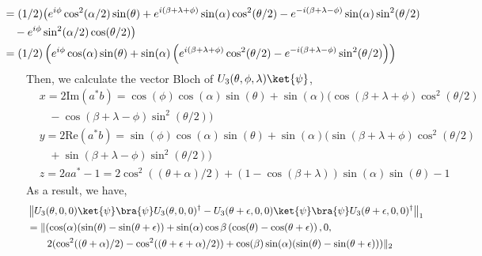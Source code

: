 \begin{example} 
\begin{align*}
  \hspace{-25pt} & = (1/2) \big( e^{i \phi} \cos^2(\alpha/2) \sin(\theta) + e^{i (\beta + \lambda + \phi)} \sin(\alpha) \cos^2(\theta/2) - e^{-i (\beta + \lambda -\phi)} \sin(\alpha) \sin^2(\theta/2) \\
  \hspace{-25pt} & \hspace{10pt}  - e^{i \phi} \sin^2(\alpha/2) \cos(\theta/2)  \big) \\
  \hspace{-25pt} & = (1/2) \left( e^{i \phi}\cos(\alpha) \sin(\theta) +  \sin(\alpha) \left(e^{i (\beta + \lambda + \phi)} \cos^2(\theta/2) - e^{-i (\beta + \lambda - \phi)} \sin^2(\theta/2)\right)  \right)
\end{align*}
Then, we calculate the vector Bloch of $U_3(\theta, \phi, \lambda) \ket{\psi}$,
\begin{align*}
  &x = 2 \text{Im} \left( a^{*}b \right) =   \cos(\phi) \cos(\alpha) \sin(\theta) +  \sin(\alpha) \big(\cos{(\beta + \lambda + \phi)} \cos^2(\theta/2) \\
  & \hspace{10pt} - \cos{(\beta + \lambda - \phi)} \sin^2(\theta/2)\big)  \\
  &y = 2 \text{Re} \left( a^{*}b \right) = \sin(\phi) \cos(\alpha) \sin(\theta) +  \sin(\alpha) \big(\sin{(\beta + \lambda + \phi)} \cos^2(\theta/2) \\
  & \hspace{10pt} + \sin{(\beta + \lambda - \phi)} \sin^2(\theta/2)\big) \\
  & z = 2 aa^* -1 = 2 \cos^2((\theta+\alpha)/2)+(1-\cos(\beta + \lambda))\sin(\alpha)\sin(\theta) -1
\end{align*}
As a result, we have,
\begin{align*}
  & \tracenorm{U_3(\theta, 0, 0) \ket{\psi}\bra{\psi} U_3(\theta, 0, 0)^\dag - U_3(\theta + \epsilon, 0, 0) \ket{\psi}\bra{\psi}U_3(\theta+\epsilon, 0, 0)^\dag } \\
  & = \lVert ( \cos(\alpha) (\sin(\theta) - \sin(\theta + \epsilon)) +  \sin(\alpha) \cos{\beta} \left(\cos(\theta) - \cos(\theta + \epsilon) \right) , 0,\\
  & \hspace{20pt} 2 (\cos^2((\theta+\alpha)/2) - \cos^2((\theta+ \epsilon+\alpha)/2))+\cos(\beta) \sin(\alpha)(\sin(\theta) - \sin(\theta+\epsilon)) )\rVert_2 \\

\end{align*}
\end{example}

